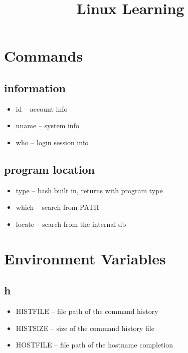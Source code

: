 \documentclass[titlepage]{article}
\begin{document}
	\title{Linux Learning}
	\maketitle
	
	\section{Commands}
	  \subsection{information}
	    \begin{itemize}
	    	\item id -- account info
	    	\item uname -- system info
	    	\item who -- login session info
	    \end{itemize}
    
      \subsection{program location}
        \begin{itemize}
        	\item type -- bash built in, returns with program type
        	\item which -- search from PATH
        	\item locate -- search from the internal db
        \end{itemize}
    
    \section{Environment Variables}
      \subsection{h}
        \begin{itemize}
        	\item HISTFILE -- file path of the command history
        	\item HISTSIZE -- size of the command history file
        	\item HOSTFILE -- file path of the hostname completion
        \end{itemize}
\end{document}
